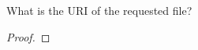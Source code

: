 \documentclass[../../main.tex]{subfiles}
\begin{document}
\begin{wts}
What is the URI of the requested file?
\end{wts}
\begin{proof}

\end{proof}
\end{document}
